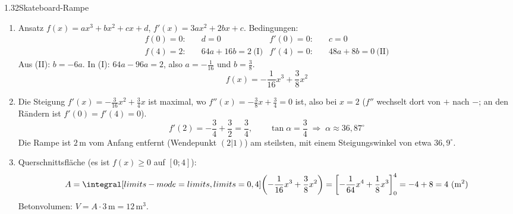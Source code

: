 \begin{loesung}{1.32}{Skateboard-Rampe}
\begin{enumerate}[label=\alph*)]
  \item Ansatz $f(x) = ax^3+bx^2+cx+d$, $f'(x) = 3ax^2+2bx+c$. Bedingungen:
  \begin{align*}
    f(0) = 0:&\quad d = 0 & f'(0) = 0:&\quad c = 0\\
    f(4) = 2:&\quad 64a+16b = 2\ \text{(I)} & f'(4) = 0:&\quad 48a+8b = 0\ \text{(II)}
  \end{align*}
  Aus (II): $b = -6a$. In (I): $64a-96a = 2$, also $a = -\frac{1}{16}$ und $b = \frac{3}{8}$.
  \[f(x) = -\dfrac{1}{16}x^3+\dfrac{3}{8}x^2\]
  \item Die Steigung $f'(x) = -\frac{3}{16}x^2+\frac{3}{4}x$ ist maximal, wo $f''(x) = -\frac{3}{8}x+\frac{3}{4} = 0$ ist, also bei $x=2$ ($f''$ wechselt dort von $+$ nach $-$; an den Rändern ist $f'(0)=f'(4)=0$).
  \[f'(2) = -\dfrac{3}{4}+\dfrac{3}{2} = \dfrac{3}{4},\qquad \tan{\alpha} = \dfrac{3}{4}\;\Longrightarrow\;\alpha\approx 36{,}87^{\circ}\]
  Die Rampe ist $2\,\text{m}$ vom Anfang entfernt (Wendepunkt $(2|1)$) am steilsten, mit einem Steigungswinkel von etwa $36{,}9^{\circ}$.
  \item Querschnittsfläche (es ist $f(x)\geq 0$ auf $[0;4]$):
  \[A = \integral[limits-mode=limits,limits={0, 4}]{\left(-\dfrac{1}{16}x^3+\dfrac{3}{8}x^2\right)} = \left[-\dfrac{1}{64}x^4+\dfrac{1}{8}x^3\right]_0^4 = -4+8 = 4\ (\text{m}^2)\]
  Betonvolumen: $V = A\cdot 3\,\text{m} = 12\,\text{m}^3$.
\end{enumerate}
\end{loesung}

